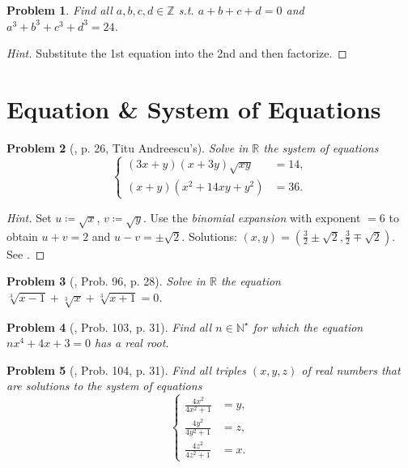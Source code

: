 \documentclass[oneside]{book}
\numberwithin{equation}{section}
\newtheorem{problem}{Problem}[section]
\begin{document}
\begin{problem}
	Find all $a,b,c,d\in\mathbb{Z}$ s.t. $a + b + c + d = 0$ and $a^3 + b^3 + c^3 + d^3 = 24$.
\end{problem}

\begin{proof}[Hint]
	Substitute the 1st equation into the 2nd and then factorize.
\end{proof}

\section{Equation \& System of Equations}

\begin{problem}[\cite{Gelca_Andreescu2017}, p. 26, Titu Andreescu's]
	Solve in $\mathbb{R}$ the system of equations
	\begin{equation*}
		\left\{\begin{split}
			(3x + y)(x + 3y)\sqrt{xy} &= 14,\\
			(x + y)(x^2 + 14xy + y^2) &= 36.
		\end{split}\right.
	\end{equation*}
\end{problem}

\begin{proof}[Hint]
	Set $u\coloneqq\sqrt{x}$, $v\coloneqq\sqrt{y}$. Use the \textit{binomial expansion} with exponent $= 6$ to obtain $u + v = 2$ and $u - v = \pm\sqrt{2}$. Solutions: $(x,y) = \left(\frac{3}{2}\pm\sqrt{2},\frac{3}{2}\mp\sqrt{2}\right)$. See \cite[p. 26]{Gelca_Andreescu2017}.
\end{proof}

\begin{problem}[\cite{Gelca_Andreescu2017}, Prob. 96, p. 28]
	Solve in $\mathbb{R}$ the equation $\sqrt[3]{x - 1} + \sqrt[3]{x} + \sqrt[3]{x + 1} = 0$.
\end{problem}

\begin{problem}[\cite{Gelca_Andreescu2017}, Prob. 103, p. 31]
	Find all $n\in\mathbb{N}^\star$ for which the equation $nx^4 + 4x + 3 = 0$ has a real root.
\end{problem}

\begin{problem}[\cite{Gelca_Andreescu2017}, Prob. 104, p. 31]
	Find all triples $(x,y,z)$ of real numbers that are solutions to the system of equations
	\begin{equation*}
		\left\{\begin{split}
			\frac{4x^2}{4x^2 + 1} &= y,\\
			\frac{4y^2}{4y^2 + 1} &= z,\\
			\frac{4z^2}{4z^2 + 1} &= x.
		\end{split}\right.
	\end{equation*}
\end{problem}
\end{document}
